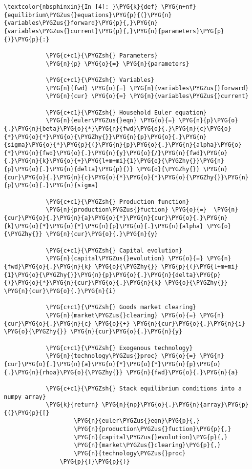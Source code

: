 \documentclass[letterpaper,10pt,openany,oneside,english]{sphinxmanual}
\begin{document}
\begin{Verbatim}[commandchars=\\\{\}]
\textcolor{nbsphinxin}{In [4]: }\PYG{k}{def} \PYG{n+nf}{equilibrium\PYGZus{}equations}\PYG{p}{(}\PYG{n}{variables\PYGZus{}forward}\PYG{p}{,}\PYG{n}{variables\PYGZus{}current}\PYG{p}{,}\PYG{n}{parameters}\PYG{p}{)}\PYG{p}{:}
        
            \PYG{c+c1}{\PYGZsh{} Parameters}
            \PYG{n}{p} \PYG{o}{=} \PYG{n}{parameters}
        
            \PYG{c+c1}{\PYGZsh{} Variables}
            \PYG{n}{fwd} \PYG{o}{=} \PYG{n}{variables\PYGZus{}forward}
            \PYG{n}{cur} \PYG{o}{=} \PYG{n}{variables\PYGZus{}current}
        
            \PYG{c+c1}{\PYGZsh{} Household Euler equation}
            \PYG{n}{euler\PYGZus{}eqn} \PYG{o}{=} \PYG{n}{p}\PYG{o}{.}\PYG{n}{beta}\PYG{o}{*}\PYG{n}{fwd}\PYG{o}{.}\PYG{n}{c}\PYG{o}{*}\PYG{o}{*}\PYG{o}{\PYGZhy{}}\PYG{n}{p}\PYG{o}{.}\PYG{n}{sigma}\PYG{o}{*}\PYG{p}{(}\PYG{n}{p}\PYG{o}{.}\PYG{n}{alpha}\PYG{o}{*}\PYG{n}{fwd}\PYG{o}{.}\PYG{n}{y}\PYG{o}{/}\PYG{n}{fwd}\PYG{o}{.}\PYG{n}{k}\PYG{o}{+}\PYG{l+m+mi}{1}\PYG{o}{\PYGZhy{}}\PYG{n}{p}\PYG{o}{.}\PYG{n}{delta}\PYG{p}{)} \PYG{o}{\PYGZhy{}} \PYG{n}{cur}\PYG{o}{.}\PYG{n}{c}\PYG{o}{*}\PYG{o}{*}\PYG{o}{\PYGZhy{}}\PYG{n}{p}\PYG{o}{.}\PYG{n}{sigma}
        
            \PYG{c+c1}{\PYGZsh{} Production function}
            \PYG{n}{production\PYGZus{}fuction} \PYG{o}{=}  \PYG{n}{cur}\PYG{o}{.}\PYG{n}{a}\PYG{o}{*}\PYG{n}{cur}\PYG{o}{.}\PYG{n}{k}\PYG{o}{*}\PYG{o}{*}\PYG{n}{p}\PYG{o}{.}\PYG{n}{alpha} \PYG{o}{\PYGZhy{}} \PYG{n}{cur}\PYG{o}{.}\PYG{n}{y}
        
            \PYG{c+c1}{\PYGZsh{} Capital evolution}
            \PYG{n}{capital\PYGZus{}evolution} \PYG{o}{=} \PYG{n}{fwd}\PYG{o}{.}\PYG{n}{k} \PYG{o}{\PYGZhy{}} \PYG{p}{(}\PYG{l+m+mi}{1}\PYG{o}{\PYGZhy{}}\PYG{n}{p}\PYG{o}{.}\PYG{n}{delta}\PYG{p}{)}\PYG{o}{*}\PYG{n}{cur}\PYG{o}{.}\PYG{n}{k} \PYG{o}{\PYGZhy{}} \PYG{n}{cur}\PYG{o}{.}\PYG{n}{i}
        
            \PYG{c+c1}{\PYGZsh{} Goods market clearing}
            \PYG{n}{market\PYGZus{}clearing} \PYG{o}{=} \PYG{n}{cur}\PYG{o}{.}\PYG{n}{c} \PYG{o}{+} \PYG{n}{cur}\PYG{o}{.}\PYG{n}{i} \PYG{o}{\PYGZhy{}} \PYG{n}{cur}\PYG{o}{.}\PYG{n}{y}
        
            \PYG{c+c1}{\PYGZsh{} Exogenous technology}
            \PYG{n}{technology\PYGZus{}proc} \PYG{o}{=} \PYG{n}{cur}\PYG{o}{.}\PYG{n}{a}\PYG{o}{*}\PYG{o}{*}\PYG{n}{p}\PYG{o}{.}\PYG{n}{rhoa}\PYG{o}{\PYGZhy{}} \PYG{n}{fwd}\PYG{o}{.}\PYG{n}{a}
        
            \PYG{c+c1}{\PYGZsh{} Stack equilibrium conditions into a numpy array}
            \PYG{k}{return} \PYG{n}{np}\PYG{o}{.}\PYG{n}{array}\PYG{p}{(}\PYG{p}{[}
                    \PYG{n}{euler\PYGZus{}eqn}\PYG{p}{,}
                    \PYG{n}{production\PYGZus{}fuction}\PYG{p}{,}
                    \PYG{n}{capital\PYGZus{}evolution}\PYG{p}{,}
                    \PYG{n}{market\PYGZus{}clearing}\PYG{p}{,}
                    \PYG{n}{technology\PYGZus{}proc}
                \PYG{p}{]}\PYG{p}{)}
\end{Verbatim}
\end{document}
